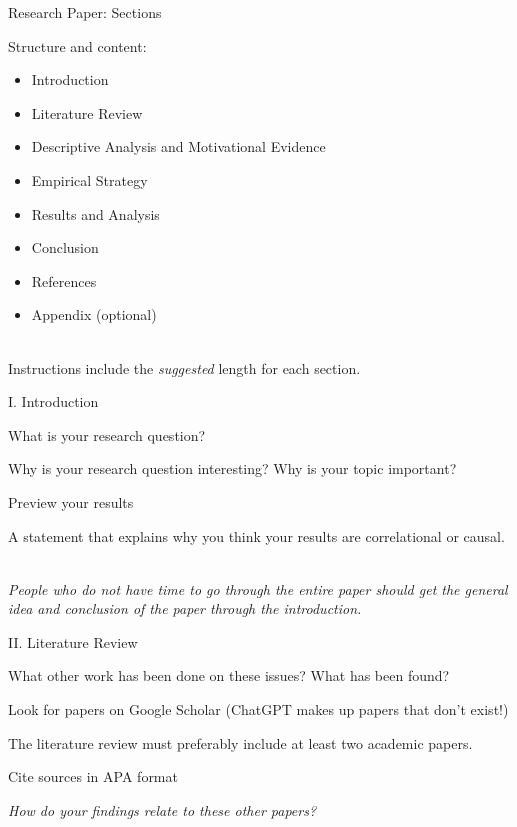 \documentclass{./../Lectures/div_teaching_slides}
\begin{document}
\begin{frame}{Research Paper: Sections}
\begin{witemize}
\item Structure and content: \\
  \begin{itemize}
  \normalsize
  \item Introduction
  \item Literature Review
  \item Descriptive Analysis and Motivational Evidence
  \item Empirical Strategy
  \item Results and Analysis
  \item Conclusion
  \item References
  \item Appendix (optional) \\~\\
\end{itemize}
\end{witemize}
Instructions include the \textit{suggested} length for each section.
\end{frame}

\begin{frame}{I. Introduction}
\begin{witemize}
  \item What is your research question?
  \item Why is your research question interesting? Why is your topic important?
  \item Preview your results 
  \item A statement that explains why you think your results are correlational or causal. \\~\\
\end{witemize}
\textit{People who do not have time to go through the entire paper should get the general idea and conclusion of the paper through the introduction.}
\end{frame}

\begin{frame}{II. Literature Review}
\begin{witemize}
  \item What other work has been done on these issues? What has been found?
  \item Look for papers on Google Scholar (ChatGPT makes up papers that don't exist!)
  \item The literature review must preferably include at least two academic papers.
  \item Cite sources in APA format \\
\end{witemize}
\textit{How do your findings relate to these other papers?}
\end{frame}
\end{document}
